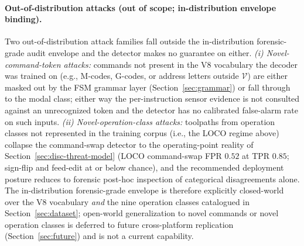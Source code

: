 \documentclass[sensors,article,submit,moreauthors,pdftex]{Definitions/mdpi}
\begin{document}
\paragraph{Out-of-distribution attacks (out of scope; in-distribution envelope binding).} Two out-of-distribution attack families fall outside the in-distribution forensic-grade audit envelope and the detector makes no guarantee on either. \emph{(i) Novel-command-token attacks:} commands not present in the V8 vocabulary the decoder was trained on (e.g., M-codes, G-codes, or address letters outside $\mathcal{V}$) are either masked out by the FSM grammar layer (Section~\ref{sec:grammar}) or fall through to the modal class; either way the per-instruction sensor evidence is not consulted against an unrecognized token and the detector has no calibrated false-alarm rate on such inputs. \emph{(ii) Novel-operation-class attacks:} toolpaths from operation classes not represented in the training corpus (i.e., the LOCO regime above) collapse the command-swap detector to the operating-point reality of Section~\ref{sec:disc-threat-model} (LOCO command-swap FPR $0.52$ at TPR $0.85$; sign-flip and feed-edit at or below chance), and the recommended deployment posture reduces to forensic post-hoc inspection of categorical disagreements alone. The in-distribution forensic-grade envelope is therefore explicitly closed-world over the V8 vocabulary \emph{and} the nine operation classes catalogued in Section~\ref{sec:dataset}; open-world generalization to novel commands or novel operation classes is deferred to future cross-platform replication (Section~\ref{sec:future}) and is not a current capability.
\end{document}
